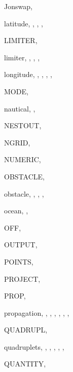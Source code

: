\documentclass[12pt]{book}
\begin{document}
\begin{theindex}
  \item Jonswap, 

  \indexspace

  \item latitude, , , , 
  \item LIMITER, 
  \item limiter, , , , 
  \item longitude, , , , 
		, 

  \indexspace

  \item MODE, 

  \indexspace

  \item nautical, , 
  \item NESTOUT, 
  \item NGRID, 
  \item NUMERIC, 

  \indexspace

  \item OBSTACLE, 
  \item obstacle, , , , 
  \item ocean, , 
  \item OFF, 
  \item OUTPUT, 

  \indexspace

  \item POINTS, 
  \item PROJECT, 
  \item PROP, 
  \item propagation, , , , 
		, , , 

  \indexspace

  \item QUADRUPL, 
  \item quadruplets, , , , 
		, , 
  \item QUANTITY, 


\end{theindex}
\end{document}
